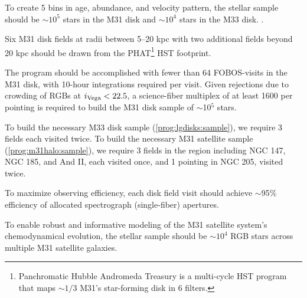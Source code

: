 \documentclass[11pt,a4paper,twoside,onecolumn,openany,final,oldfontcommands]{memoir}
\begin{document}
\begin{programrequirement}
\reqitem To create 5 bins in age, abundance, and velocity pattern, the stellar sample should be $\sim 10^5$ stars in the M31 disk and $\sim 10^4$ stars in the M33 disk. \label{prog:lgdisks:sample} .  

\reqitem Six M31 disk fields at radii between 5--20 kpc with two additional fields beyond 20 kpc should be drawn from the PHAT\footnote{Panchromatic Hubble Andromeda Treasury \citep{phat} is a multi-cycle HST program that maps $\sim1/3$ M31's star-forming disk in 6 filters.} HST footprint.  

\reqitem The program should be accomplished with fewer than 64 FOBOS-visits in the M31 disk, with 10-hour integrations required per visit.  Given rejections due to crowding \citep{dorman12} of RGBs at $i_{\rm Vega} < 22.5$, a science-fiber multiplex of at least 1600 per pointing is required to build the M31 disk sample of $\sim$10$^5$ stars.



\reqitem To build the necessary M33 disk sample (\ref{prog:lgdisks:sample}), we require 3 fields each visited twice.
\reqitem To build the necessary M31 satellite sample (\ref{prog:m31halo:sample}), we require 3 fields in the region including NGC 147, NGC 185, and And II, each visited once, and 1 pointing in NGC 205, visited twice.  


\reqitem To maximize observing efficiency, each disk field visit should achieve $\sim$95\% efficiency of allocated spectrograph (single-fiber) apertures.


\reqitem To enable robust and informative modeling of the M31 satellite system's chemodynamical evolution, the stellar sample should be $\sim10^{4}$ RGB stars across multiple M31 satellite galaxies.  \label{prog:m31halo:sample}

\end{programrequirement}
\end{document}
